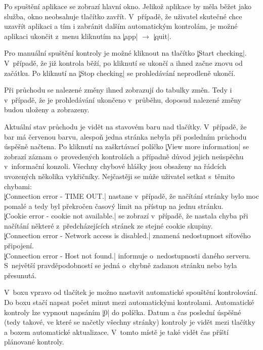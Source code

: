 Po spuštění aplikace se zobrazí hlavní okno.
Jelikož aplikace by měla běžet jako služba, okno neobsahuje tlačítko zavřít.
V~případě, že uživatel skutečné chce uzavřít aplikaci a tím i zabránit dalším automatickým kontrolám, je možné aplikaci ukončit z~menu kliknutím na \c|app| $\rightarrow$ \c|quit|.

Pro manuální spuštění kontroly je možné kliknout na tlačítko \c|Start checking|.
V~případě, že již kontrola běží, po kliknutí se ukončí a ihned začne znovu od začátku.
Po kliknutí na \c|Stop checking| se prohledávání neprodleně ukončí.

Při průchodu se nalezené změny ihned zobrazují do tabulky změn.
Tedy i v~případě, že je prohledávání ukončeno v~průběhu, doposud nalezené změny budou uloženy a zobrazeny.

Aktuální stav průchodu je vidět na stavovém baru  nad tlačítky.
V~případě, že bar má červenou barvu, alespoň jedna stránka nebyla při posledním průchodu úspěšně načtena.
Po kliknutí na zaškrtávací políčko \c|View more information| se zobrazí záznam o~provedených kontrolách a případně důvod jejich neúspěchu v~informační konzoli.
Všechny chybové hlášky jsou obsaženy na řádcích uvozených několika vykřičníky.
Nejčastěji se může uživatel setkat s~těmito chybami:\\
\c|Connection error - TIME OUT.| nastane v~případě, že načítání stránky bylo moc pomalé a tedy byl překročen časový limit na přístup na jednu stránku.\\ %
\c|Cookie error - cookie not available.| se zobrazí v~případě, že nastala chyba při načítání některé z~předcházejících stránek ze stejné cookie skupiny.\\
\c|Connection error - Network access is disabled.| znamená nedostupnost síťového připojení.\\
\c|Connection error - Host not found.| informuje o~nedostupnosti daného serveru. S~největší pravděpodobností se  jedná o~chybně zadanou stránku nebo byla přesunutá.

V~boxu vpravo od tlačítek je možno nastavit automatické spouštění kontrolování.
Do boxu stačí napsat počet minut mezi automatickými kontrolami.
Automatické kontroly lze vypnout napsáním \c|0| do políčka.
Datum a čas poslední úspěšné (tedy takové, ve které se načetly všechny stránky) kontroly je vidět mezi tlačítky a boxem automatické aktualizace.
V~tomto místě je také vidět čas příští plánované kontroly.

